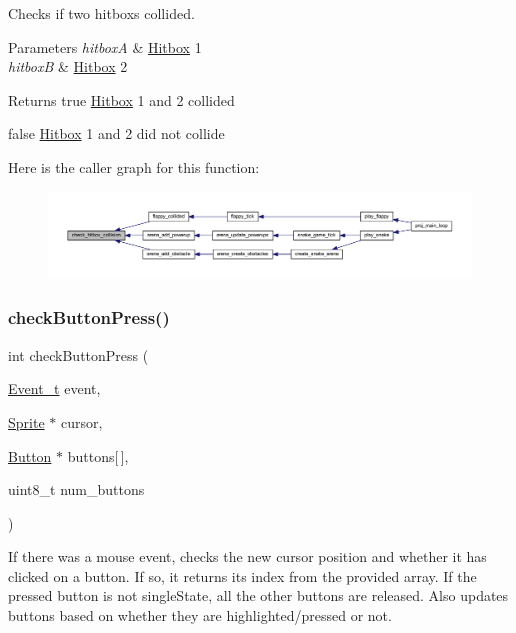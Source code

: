 Checks if two hitboxs collided. 


\begin{DoxyParams}{Parameters}
{\em hitboxA} & \mbox{\hyperlink{struct_hitbox}{Hitbox}} 1 \\
\hline
{\em hitboxB} & \mbox{\hyperlink{struct_hitbox}{Hitbox}} 2 \\
\hline
\end{DoxyParams}
\begin{DoxyReturn}{Returns}
true \mbox{\hyperlink{struct_hitbox}{Hitbox}} 1 and 2 collided 

false \mbox{\hyperlink{struct_hitbox}{Hitbox}} 1 and 2 did not collide 
\end{DoxyReturn}
Here is the caller graph for this function\+:\nopagebreak
\begin{figure}[H]
\begin{center}
\leavevmode
\includegraphics[width=350pt]{group__sprite_gace4cfe7bbf61f89e7342615ed1dccf56_icgraph}
\end{center}
\end{figure}
\mbox{\label{group__sprite_ga34874b7023163a28e2d314d7ab833da1}} 
\subsubsection{\texorpdfstring{check\+Button\+Press()}{checkButtonPress()}}
{\footnotesize\ttfamily int check\+Button\+Press (\begin{DoxyParamCaption}\item[{\mbox{\hyperlink{struct_event__t}{Event\+\_\+t}}}]{event,  }\item[{\mbox{\hyperlink{struct_sprite}{Sprite}} $\ast$}]{cursor,  }\item[{\mbox{\hyperlink{struct_button}{Button}} $\ast$}]{buttons\mbox{[}$\,$\mbox{]},  }\item[{uint8\+\_\+t}]{num\+\_\+buttons }\end{DoxyParamCaption})}



If there was a mouse event, checks the new cursor position and whether it has clicked on a button. If so, it returns its index from the provided array. If the pressed button is not single\+State, all the other buttons are released. Also updates buttons based on whether they are highlighted/pressed or not. 


